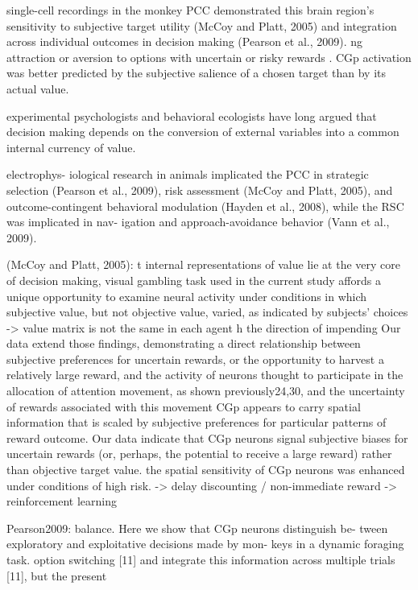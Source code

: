 \documentclass{article} %
\begin{document}
single-cell recordings in the monkey PCC demonstrated this brain region's sensitivity to subjective target utility (McCoy and Platt, 2005) and integration across individual outcomes in decision making (Pearson et al., 2009). 
ng attraction or aversion to options with uncertain or risky rewards
. CGp activation was better predicted by the
subjective salience of a chosen target than by its actual value. 

experimental psychologists and behavioral ecologists
have long argued that decision making depends on the conversion
of external variables into a common internal currency of value.



electrophys- iological research in animals implicated the PCC in strategic selection (Pearson et al., 2009), risk assessment (McCoy and Platt, 2005), and outcome-contingent behavioral modulation (Hayden et al., 2008), while the RSC was implicated in nav- igation and approach-avoidance behavior (Vann et al., 2009).

(McCoy and Platt, 2005):
t internal representations of value lie at the very core of
decision making,
visual gambling task used in the current study affords a unique
opportunity to examine neural activity under conditions in which
subjective value, but not objective value, varied, as indicated by
subjects’ choices
-> value matrix is not the same in each agent
h the direction of impending
Our data extend those
findings, demonstrating a direct relationship between subjective preferences
for uncertain rewards, or the opportunity to harvest a
relatively large reward, and the activity of neurons thought to participate
in the allocation of attention
movement, as shown previously24,30, and the uncertainty of rewards
associated with this movement
CGp appears to carry spatial information that is scaled by
subjective preferences for particular patterns of reward outcome.
Our data indicate that CGp
neurons signal subjective biases for uncertain rewards (or, perhaps, the
potential to receive a large reward) rather than objective target value.
the spatial sensitivity of CGp neurons was enhanced under
conditions of high risk.
-> delay discounting / non-immediate reward -> reinforcement learning


Pearson2009:
balance. Here we show that CGp neurons distinguish be- tween exploratory and exploitative decisions made by mon- keys in a dynamic foraging task.
 option switching [11] and integrate this information across multiple trials [11], but the present
 
\end{document}
